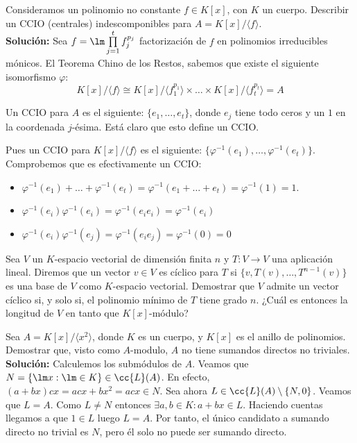 \begin{ejerciciostar} \label{ej35}
    Consideramos un polinomio no constante $f \in K[x]$, con $K$ un cuerpo. Describir un CCIO (centrales) indescomponibles para $A=K[x]/\langle f \rangle $. \\
    
    \noindent
    \textbf{Solución:}
    Sea $f = \lm \prod\limits_{j=1}^{t} f_j^{p_j}$ factorización de $f$ en polinomios irreducibles mónicos. El Teorema Chino de los Restos, sabemos que existe el siguiente isomorfismo $\varphi $: 
    \begin{equation*}
        K[x]/\langle f \rangle \cong K[x]/\langle f_1^{p_1} \rangle \times \ldots \times K[x]/\langle f_t^{p_t} \rangle = A
    \end{equation*}

    Un CCIO para $A$ es el siguiente: $\{e_1, \ldots, e_t\}$, donde $e_j$ tiene todo ceros y un $1$ en la coordenada $j$-ésima. Está claro que esto define un CCIO.

    Pues un CCIO para $K[x]/\langle f \rangle $ es el siguiente: $\{\varphi^{-1}(e_1), \ldots, \varphi^{-1}(e_t)\}$. Comprobemos que es efectivamente un CCIO:
    \begin{itemize}
        \item $\varphi^{-1}(e_1) + \ldots + \varphi^{-1}(e_t) = \varphi^{-1}(e_1+\ldots+e_t) = \varphi^{-1}(1) = 1$.
        \item $\varphi^{-1}(e_i) \varphi^{-1}(e_i) = \varphi^{-1}(e_ie_i) = \varphi^{-1}(e_i)$
        \item $\varphi^{-1}(e_i) \varphi^{-1}(e_j) = \varphi^{-1}(e_ie_j) = \varphi^{-1}(0) = 0$
    \end{itemize}
\end{ejerciciostar}

\begin{ejerciciostarstar}
    Sea $V$ un $K$-espacio vectorial de dimensión finita $n$ y $T:V \to V$ una aplicación lineal. Diremos que un vector $v \in V$ es cíclico para $T$ si $\{v, T(v), \ldots, T^{n-1}(v)\}$ es una base de $V$ como $K$-espacio vectorial. Demostrar que $V$ admite un vector cíclico si, y solo si, el polinomio mínimo de $T$ tiene grado $n$. ¿Cuál es entonces la longitud de $V$ en tanto que $K[x]$-módulo?
\end{ejerciciostarstar}

\begin{ejercicio}
    Sea $A = K[x]/\langle x^2 \rangle $, donde $K$ es un cuerpo, y $K[x]$ es el anillo de polinomios. Demostrar que, visto como $A$-modulo, $A$ no tiene sumandos directos no triviales. \\
    
    \noindent
    \textbf{Solución:}
    Calculemos los submódulos de $A$. Veamos que $N = \{\lm x : \lm \in K\} \in \cc{L}(A)$. En efecto, $(a+bx)cx = acx + bx^2 = acx \in N$. Sea ahora $L \in \cc{L}(A) \setminus \{N,0\}$. Veamos que $L = A$. Como $L \neq N$ entonces $\exists a,b \in K : a+bx \in L$. Haciendo cuentas llegamos a que $1 \in L$ luego $L = A$. Por tanto, el único candidato a sumando directo no trivial es $N$, pero él solo no puede ser sumando directo. 
\end{ejercicio}

